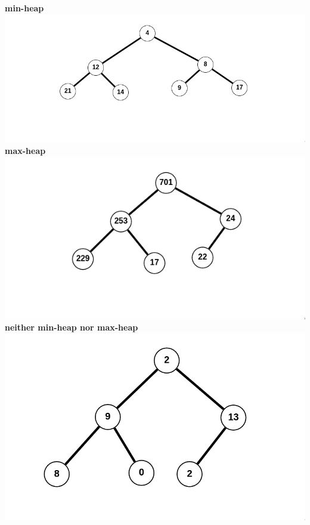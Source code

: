 \documentclass[12pt,twoside]{article}
\begin{document}
\begin{problems}
\begin{problemparts}
\problempart %
\textbf{min-heap} \\
\includegraphics[width=1.0\textwidth]{./heaps/img1.png}
\problempart %
\textbf{max-heap} \\
\includegraphics[width=1.0\textwidth]{./heaps/img2.png}
\problempart %
  \textbf{neither min-heap nor max-heap} \\
\includegraphics[width=1.0\textwidth]{./heaps/img3.png}

\end{problemparts}
\end{problems}
\end{document}
